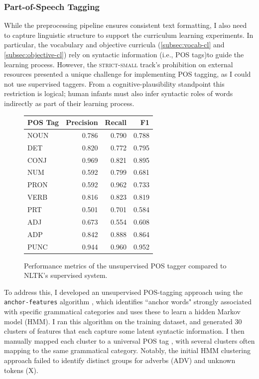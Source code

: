 \subsubsection{Part-of-Speech Tagging}

While the preprocessing pipeline ensures consistent text formatting, I also need to capture linguistic structure to support the curriculum learning experiments. In particular, the vocabulary and objective curricula (\cref{subsec:vocab-cl} and \cref{subsec:objective-cl}) rely on syntactic information (i.e., POS tags)to guide the learning process. However, the \textsc{strict-small} track's prohibition on external resources presented a unique challenge for implementing POS tagging, as I could not use supervised taggers. From a cognitive-plausibility standpoint this restriction is logical; human infants must also infer syntactic roles of words indirectly as part of their learning process.

\begin{figure}
    \centering
    \small
    \begin{tabular}{lrrr}
    \toprule
    POS Tag & Precision & Recall & F1 \\
    \midrule
    NOUN & 0.786 & 0.790 & 0.788 \\
    DET & 0.820 & 0.772 & 0.795 \\
    CONJ & 0.969 & 0.821 & 0.895 \\
    NUM & 0.592 & 0.799 & 0.681 \\
    PRON & 0.592 & 0.962 & 0.733 \\   
    VERB & 0.816 & 0.823 & 0.819 \\
    PRT & 0.501 & 0.701 & 0.584 \\
    ADJ & 0.673 & 0.554 & 0.608 \\
    ADP & 0.842 & 0.888 & 0.864 \\
    PUNC & 0.944 & 0.960 & 0.952 \\
    \bottomrule
    \end{tabular}
    \caption{\label{tbl:unsupervised-pos-performance} Performance metrics of the unsupervised POS tagger compared to NLTK's supervised system.}
    \label{fig:unsupervised-pos-performance}
\end{figure}

To address this, I developed an unsupervised POS-tagging approach using the \texttt{anchor-features} algorithm \citep{stratos2016unsupervisedpos}, which identifies ``anchor words" strongly associated with specific grammatical categories and uses these to learn a hidden Markov model (HMM). I ran this algorithm on the training dataset, and generated 30 clusters of features that each capture some latent syntactic information. I then manually mapped each cluster to a universal POS tag \citep{petrov2012universalpos}, with several clusters often mapping to the same grammatical category. Notably, the initial HMM clustering approach failed to identify distinct groups for adverbs (ADV) and unknown tokens (X). 

